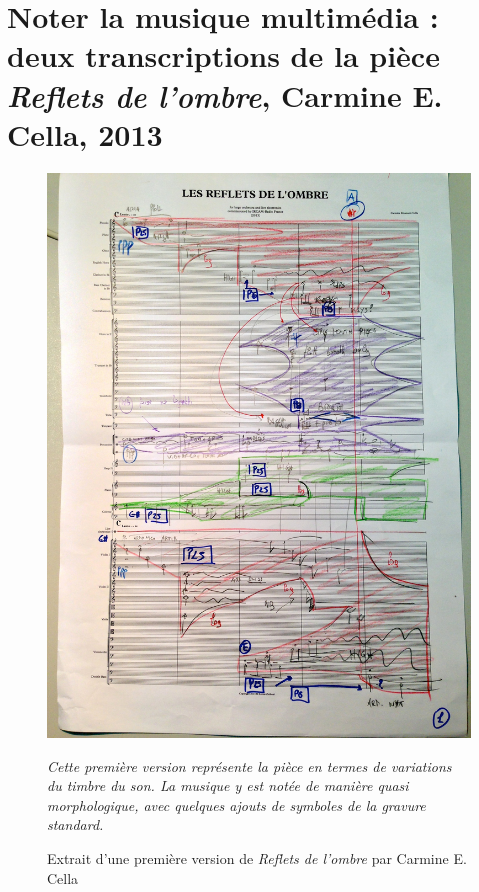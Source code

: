 \section{Noter la musique multimédia : deux transcriptions de la pièce \textit{Reflets de l'ombre}, Carmine E. Cella, 2013}
\label{sec:refletsDeLOmbre}

\begin{figure}[!htbp]
	\centering
	\includegraphics[keepaspectratio=true, width=\textwidth, angle = -90]{Annexes/i/refletsDeLOmbreFantaisie.jpg}
	\caption{Extrait d'une première version de \textit{Reflets de l'ombre} par Carmine E. Cella}
	\medskip
	\small
	\textit{Cette première version représente la pièce en termes de variations du timbre du son.
	La musique y est notée de manière quasi morphologique, avec quelques ajouts de symboles de la gravure standard.}	
	\label{fig:refletsDeLOmbreFantaisie}
\end{figure}

